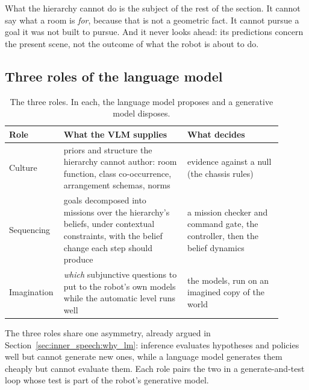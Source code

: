 What the hierarchy cannot do is the subject of the rest of the section. It cannot say what a room is \emph{for},
because that is not a geometric fact. It cannot pursue a goal it was not built to pursue. And it never looks ahead:
its predictions concern the present scene, not the outcome of what the robot is about to do.

\subsection{Three roles of the language model}
\label{sec:lang_hierarchy:roles}

\begin{table}[ht]
    \centering
    \small
    \begin{tabular}{|>{\raggedright\arraybackslash}p{0.14\linewidth}|>{\raggedright\arraybackslash}p{0.43\linewidth}|>{\raggedright\arraybackslash}p{0.33\linewidth}|}
        \hline
        \textbf{Role} & \textbf{What the VLM supplies} & \textbf{What decides} \\ \hline
        Culture     & priors and structure the hierarchy cannot author: room function, class co-occurrence, arrangement schemas, norms & evidence against a null (the chassis rules) \\ \hline
        Sequencing  & goals decomposed into missions over the hierarchy's beliefs, under contextual constraints, with the belief change each step should produce & a mission checker and command gate, the controller, then the belief dynamics \\ \hline
        Imagination & \emph{which} subjunctive questions to put to the robot's own models while the automatic level runs well & the models, run on an imagined copy of the world \\ \hline
    \end{tabular}
    \caption{The three roles. In each, the language model proposes and a generative model disposes.}
    \label{tab:lh_roles}
\end{table}

The three roles share one asymmetry, already argued in Section~\ref{sec:inner_speech:why_lm}: inference evaluates
hypotheses and policies well but cannot generate new ones, while a language model generates them cheaply but cannot
evaluate them. Each role pairs the two in a generate-and-test loop whose test is part of the robot's generative model.

